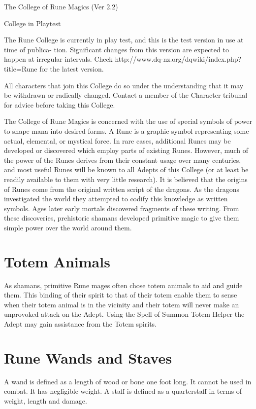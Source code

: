 \begin{Chapter}{The College of Rune Magics (Ver 2.2)}

College in Playtest 

The Rune College is currently in play test, and this is the test
version in use at time of publica- tion.  Significant changes from
this version are expected to happen at irregular intervals. Check
http://www.dq-nz.org/dqwiki/index.php?title=Rune for the latest
version.

All characters that join this College do so under the understanding
that it may be withdrawn or radically changed.  Contact a member of
the Character tribunal for advice before taking this College.

The College of Rune Magics is concerned with the use of special
symbols of power to shape mana into desired forms.  A Rune is a
graphic symbol representing some actual, elemental, or mystical force.
In rare cases, additional Runes may be developed or discovered which
employ parts of existing Runes. However, much of the power of the
Runes derives from their constant usage over many centuries, and most
useful Runes will be known to all Adepts of this College (or at least
be readily available to them with very little research). It is
believed that the origins of Runes come from the original written
script of the dragons. As the dragons investigated the world they
attempted to codify this knowledge as written symbols.  Ages later
early mortals discovered fragments of these writing.  From these
discoveries, prehistoric shamans developed primitive magic to give
them simple power over the world around them.


\section{Totem Animals}

As shamans, primitive Rune mages often chose totem animals to aid and
guide them. This binding of their spirit to that of their totem enable
them to sense when their totem animal is in the vicinity and their
totem will never make an unprovoked attack on the Adept.  Using the
Spell of Summon Totem Helper the Adept may gain assistance from the
Totem spirits.


\section{Rune Wands and Staves}

A wand is defined as a length of wood or bone one foot long. It cannot
be used in combat. It has negligible weight.  A staff is defined as a
quarterstaff in terms of weight, length and damage.


\end{Chapter}
